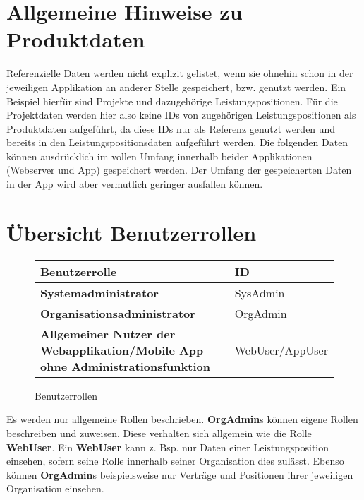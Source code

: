 \section{Allgemeine Hinweise zu Produktdaten}

Referenzielle Daten werden nicht explizit gelistet, wenn sie ohnehin schon in der jeweiligen Applikation an anderer Stelle gespeichert, bzw. genutzt werden.
Ein Beispiel hierfür sind Projekte und dazugehörige Leistungspositionen. Für die Projektdaten werden hier also keine IDs von zugehörigen Leistungspositionen
als Produktdaten aufgeführt, da diese IDs nur als Referenz genutzt werden und bereits in den Leistungspositionsdaten aufgeführt werden.
Die folgenden Daten können ausdrücklich im vollen Umfang innerhalb beider Applikationen (Webserver und App) gespeichert werden. Der Umfang der gespeicherten Daten in der App wird aber vermutlich geringer ausfallen können.

\section{Übersicht Benutzerrollen}

\begin{figure}[h]
	\centering
	\begin{tabularx}{\textwidth}{| X | X |}
        \hline
		\textbf{Benutzerrolle} & \textbf{ID} \\ \hline \hline
		\textbf{Systemadministrator} & SysAdmin \\ \hline
		\textbf{Organisationsadministrator} & OrgAdmin \\ \hline
        \textbf{Allgemeiner Nutzer der Webapplikation/Mobile App ohne Administrationsfunktion} & WebUser/AppUser \\ \hline
	\end{tabularx}
	\caption{Benutzerrollen}
	\label{fig:Benutzerrollen}
\end{figure}

\begin{flushleft}
Es werden nur allgemeine Rollen beschrieben. \textbf{OrgAdmin}s können eigene Rollen beschreiben und zuweisen. Diese verhalten sich allgemein wie die Rolle \textbf{WebUser}.
Ein \textbf{WebUser} kann z. Bsp. nur Daten einer Leistungsposition einsehen, sofern seine Rolle innerhalb seiner Organisation dies zulässt. Ebenso können \textbf{OrgAdmin}s beispielsweise nur Verträge und
Positionen ihrer jeweiligen Organisation einsehen.
\end{flushleft}

